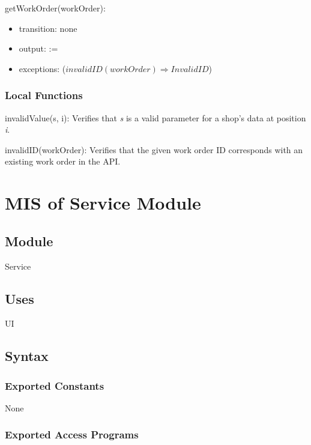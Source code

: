 \documentclass[12pt, titlepage]{article}
\begin{document}
\noindent getWorkOrder(workOrder):
\begin{itemize}
\item transition: none
\item output:  := 
\item exceptions: ($invalidID(workOrder) \Rightarrow InvalidID$)
\end{itemize}


\subsubsection{Local Functions}

\noindent invalidValue(s, i): Verifies that \textit{s} is a valid parameter for a shop's data at position \textit{i}.

\noindent invalidID(workOrder): Verifies that the given work order ID corresponds with an existing work order in the API.

\newpage

\section{MIS of Service Module} \label{mService}

\subsection{Module}

Service

\subsection{Uses}

UI

\subsection{Syntax}

\subsubsection{Exported Constants}

None

\subsubsection{Exported Access Programs}
\end{document}
